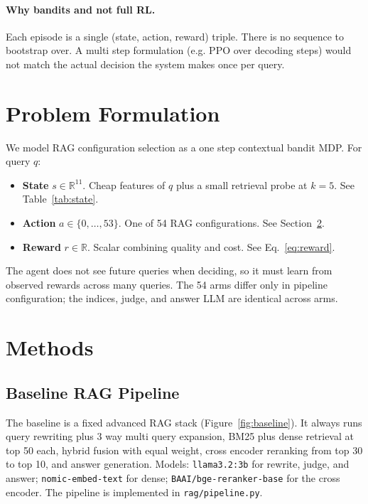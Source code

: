 \documentclass{article}
\begin{document}
\paragraph{Why bandits and not full RL.} Each episode is a single (state, action, reward) triple. There is no sequence to bootstrap over. A multi step formulation (e.g. PPO over decoding steps) would not match the actual decision the system makes once per query.

\section{Problem Formulation}

We model RAG configuration selection as a one step contextual bandit MDP. For query $q$:

\begin{itemize}
    \item \textbf{State} $s \in \mathbb{R}^{11}$. Cheap features of $q$ plus a small retrieval probe at $k=5$. See Table~\ref{tab:state}.
    \item \textbf{Action} $a \in \{0, \dots, 53\}$. One of 54 RAG configurations. See Section~\ref{sec:methods}.
    \item \textbf{Reward} $r \in \mathbb{R}$. Scalar combining quality and cost. See Eq.~\ref{eq:reward}.
\end{itemize}

The agent does not see future queries when deciding, so it must learn from observed rewards across many queries. The 54 arms differ only in pipeline configuration; the indices, judge, and answer LLM are identical across arms.

\section{Methods}
\label{sec:methods}

\subsection{Baseline RAG Pipeline}

The baseline is a fixed advanced RAG stack (Figure~\ref{fig:baseline}). It always runs query rewriting plus 3 way multi query expansion, BM25 plus dense retrieval at top 50 each, hybrid fusion with equal weight, cross encoder reranking from top 30 to top 10, and answer generation. Models: \texttt{llama3.2:3b} for rewrite, judge, and answer; \texttt{nomic-embed-text} for dense; \texttt{BAAI/bge-reranker-base} for the cross encoder. The pipeline is implemented in \texttt{rag/pipeline.py}.
\end{document}
